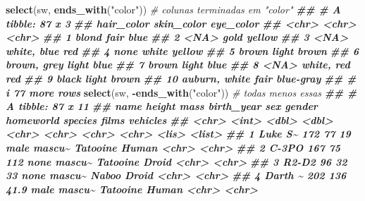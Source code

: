 \documentclass[
  portuguese,
  11pt,
  openany]{book}
\newenvironment{Shaded}{\begin{snugshade}}{\end{snugshade}}
\newcommand{\CommentTok}[1]{\textcolor[rgb]{0.56,0.35,0.01}{\textit{#1}}}
\newcommand{\DocumentationTok}[1]{\textcolor[rgb]{0.56,0.35,0.01}{\textbf{\textit{#1}}}}
\newcommand{\FunctionTok}[1]{\textcolor[rgb]{0.13,0.29,0.53}{\textbf{#1}}}
\newcommand{\NormalTok}[1]{#1}
\newcommand{\SpecialCharTok}[1]{\textcolor[rgb]{0.81,0.36,0.00}{\textbf{#1}}}
\newcommand{\StringTok}[1]{\textcolor[rgb]{0.31,0.60,0.02}{#1}}
\newcounter{none} %
\begin{document}
\begin{Shaded}
\begin{Highlighting}[]
\FunctionTok{select}\NormalTok{(sw, }\FunctionTok{ends\_with}\NormalTok{(}\StringTok{"color"}\NormalTok{))         }\CommentTok{\# colunas terminadas em "color"}
\DocumentationTok{\#\# \# A tibble: 87 x 3}
\DocumentationTok{\#\#    hair\_color    skin\_color  eye\_color}
\DocumentationTok{\#\#    \textless{}chr\textgreater{}         \textless{}chr\textgreater{}       \textless{}chr\textgreater{}    }
\DocumentationTok{\#\#  1 blond         fair        blue     }
\DocumentationTok{\#\#  2 \textless{}NA\textgreater{}          gold        yellow   }
\DocumentationTok{\#\#  3 \textless{}NA\textgreater{}          white, blue red      }
\DocumentationTok{\#\#  4 none          white       yellow   }
\DocumentationTok{\#\#  5 brown         light       brown    }
\DocumentationTok{\#\#  6 brown, grey   light       blue     }
\DocumentationTok{\#\#  7 brown         light       blue     }
\DocumentationTok{\#\#  8 \textless{}NA\textgreater{}          white, red  red      }
\DocumentationTok{\#\#  9 black         light       brown    }
\DocumentationTok{\#\# 10 auburn, white fair        blue{-}gray}
\DocumentationTok{\#\# \# i 77 more rows}
\FunctionTok{select}\NormalTok{(sw, }\SpecialCharTok{{-}}\FunctionTok{ends\_with}\NormalTok{(}\StringTok{"color"}\NormalTok{))        }\CommentTok{\# todas menos essas}
\DocumentationTok{\#\# \# A tibble: 87 x 11}
\DocumentationTok{\#\#    name    height  mass birth\_year sex   gender homeworld species films vehicles}
\DocumentationTok{\#\#    \textless{}chr\textgreater{}    \textless{}int\textgreater{} \textless{}dbl\textgreater{}      \textless{}dbl\textgreater{} \textless{}chr\textgreater{} \textless{}chr\textgreater{}  \textless{}chr\textgreater{}     \textless{}chr\textgreater{}   \textless{}lis\textgreater{} \textless{}list\textgreater{}  }
\DocumentationTok{\#\#  1 Luke S\textasciitilde{}    172    77       19   male  mascu\textasciitilde{} Tatooine  Human   \textless{}chr\textgreater{} \textless{}chr\textgreater{}   }
\DocumentationTok{\#\#  2 C{-}3PO      167    75      112   none  mascu\textasciitilde{} Tatooine  Droid   \textless{}chr\textgreater{} \textless{}chr\textgreater{}   }
\DocumentationTok{\#\#  3 R2{-}D2       96    32       33   none  mascu\textasciitilde{} Naboo     Droid   \textless{}chr\textgreater{} \textless{}chr\textgreater{}   }
\DocumentationTok{\#\#  4 Darth \textasciitilde{}    202   136       41.9 male  mascu\textasciitilde{} Tatooine  Human   \textless{}chr\textgreater{} \textless{}chr\textgreater{}   }

\end{Highlighting}
\end{Shaded}
\end{document}
